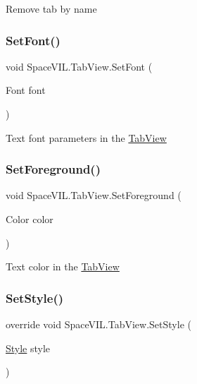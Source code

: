 Remove tab by name 

\mbox{\label{class_space_v_i_l_1_1_tab_view_a11d514c4024aae136840d60b14b61e3c}} 
\subsubsection{\texorpdfstring{Set\+Font()}{SetFont()}}
{\footnotesize\ttfamily void Space\+V\+I\+L.\+Tab\+View.\+Set\+Font (\begin{DoxyParamCaption}\item[{Font}]{font }\end{DoxyParamCaption})}



Text font parameters in the \mbox{\hyperlink{class_space_v_i_l_1_1_tab_view}{Tab\+View}} 

\mbox{\label{class_space_v_i_l_1_1_tab_view_a7a25297eecbcf09382c2752cd92d1244}} 
\subsubsection{\texorpdfstring{Set\+Foreground()}{SetForeground()}}
{\footnotesize\ttfamily void Space\+V\+I\+L.\+Tab\+View.\+Set\+Foreground (\begin{DoxyParamCaption}\item[{Color}]{color }\end{DoxyParamCaption})}



Text color in the \mbox{\hyperlink{class_space_v_i_l_1_1_tab_view}{Tab\+View}} 

\mbox{\label{class_space_v_i_l_1_1_tab_view_a02e2484cd3a31eb4d794a138981e3fa7}} 
\subsubsection{\texorpdfstring{Set\+Style()}{SetStyle()}}
{\footnotesize\ttfamily override void Space\+V\+I\+L.\+Tab\+View.\+Set\+Style (\begin{DoxyParamCaption}\item[{\mbox{\hyperlink{class_space_v_i_l_1_1_decorations_1_1_style}{Style}}}]{style }\end{DoxyParamCaption})\hspace{0.3cm}{\ttfamily [virtual]}}




